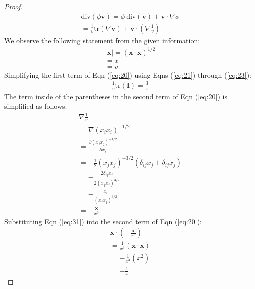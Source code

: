\begin{enumerate}
\begin{proof}
            \begin{align}
                \text{div}(\phi \mathbf{v})=\phi \ \text{div}(\mathbf{v})+\mathbf{v}\cdot \nabla \phi\\
                =\frac{1}{v}\text{tr}(\nabla \mathbf{v})+\mathbf{v}\cdot \left( \nabla \frac{1}{v} \right) \label{eq:20}
            \end{align}
            We observe the following statement from the given information:
            \begin{align}
                \lvert \mathbf{x} \rvert =(\mathbf{x}\cdot \mathbf{x})^{1/2} \label{eq:21} \\
                =x \label{eq:22} \\
                =v \label{eq:23}
                \end{align}
            Simplifying the first term of Eqn (\ref{eq:20}) using Eqns (\ref{eq:21}) through (\ref{eq:23}):
                \begin{align}
                    \frac{1}{v}\text{tr}(\mathbf{I}) =\frac{3}{x} \label{eq:24} 
                    \end{align}
            The term inside of the parentheses in the second term of Eqn (\ref{eq:20}) is simplified as follows:
            \begin{align}
                \nabla \frac{1}{v} \\
                =\nabla (x_{i}x_{i})^{-1/2} \\
                = \frac{ \partial (x_{j}x_{j})^{-1/2} }{ \partial x_{i} }  \\
                =-\frac{1}{2}(x_{j}x_{j})^{-3/2}(\delta_{ij}x_{j}+\delta_{ij}x_{j}) \\
                =-\frac{2\delta_{ij}x_{j}}{2(x_{j}x_{j})^{3/2}} \\
                =-\frac{x_{i}}{(x_{j}x_{j})^{3/2}} \\
                =-\frac{\mathbf{x}}{x^3} \label{eq:31}
                \end{align}
                Substituting Eqn (\ref{eq:31}) into the second term of Eqn (\ref{eq:20}):
                \begin{align}
                    \mathbf{x}\cdot\left( -\frac{\mathbf{x}}{x^3} \right) \\
                    =\frac{1}{x^3}(\mathbf{x}\cdot \mathbf{x}) \\
                    =-\frac{1}{x^3}(x^2) \\
                    =-\frac{1}{x} \label{eq:36}
                    \end{align}
            

\end{proof}
\end{enumerate}
